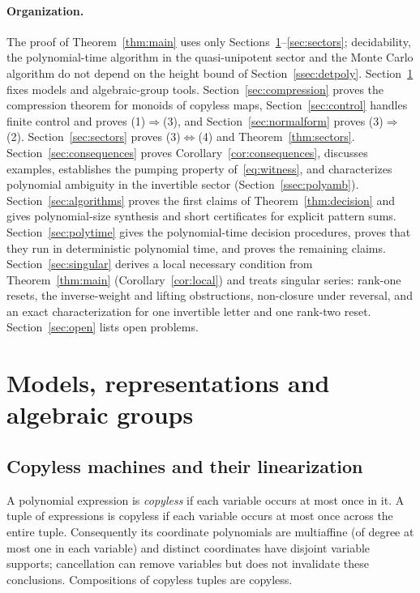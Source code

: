 \documentclass[acmlarge,screen,11pt,nonacm,natbib=false]{acmart}
\theoremstyle{definition}
\begin{document}
\paragraph{Organization.}
The proof of Theorem~\ref{thm:main} uses only Sections~\ref{sec:prelim}--\ref{sec:sectors}; decidability, the polynomial-time algorithm in the quasi-unipotent sector and the Monte Carlo algorithm do not depend on the height bound of Section~\ref{ssec:detpoly}. Section~\ref{sec:prelim} fixes models and algebraic-group tools. Section~\ref{sec:compression} proves the compression theorem for monoids of copyless maps, Section~\ref{sec:control} handles finite control and proves (1)$\Rightarrow$(3), and Section~\ref{sec:normalform} proves (3)$\Rightarrow$(2). Section~\ref{sec:sectors} proves (3)$\Leftrightarrow$(4) and Theorem~\ref{thm:sectors}. Section~\ref{sec:consequences} proves Corollary~\ref{cor:consequences}, discusses examples, establishes the pumping property of~\eqref{eq:witness}, and characterizes polynomial ambiguity in the invertible sector (Section~\ref{ssec:polyamb}). Section~\ref{sec:algorithms} proves the first claims of Theorem~\ref{thm:decision} and gives polynomial-size synthesis and short certificates for explicit pattern sums. Section~\ref{sec:polytime} gives the polynomial-time decision procedures, proves that they run in deterministic polynomial time, and proves the remaining claims. Section~\ref{sec:singular} derives a local necessary condition from Theorem~\ref{thm:main} (Corollary~\ref{cor:local}) and treats singular series: rank-one resets, the inverse-weight and lifting obstructions, non-closure under reversal, and an exact characterization for one invertible letter and one rank-two reset. Section~\ref{sec:open} lists open problems.

\section{Models, representations and algebraic groups}\label{sec:prelim}
\subsection{Copyless machines and their linearization}
A polynomial expression is \emph{copyless} if each variable occurs at most once in it. A tuple of expressions is copyless if each variable occurs at most once across the entire tuple. Consequently its coordinate polynomials are multiaffine (of degree at most one in each variable) and distinct coordinates have disjoint variable supports; cancellation can remove variables but does not invalidate these conclusions. Compositions of copyless tuples are copyless.
\end{document}
